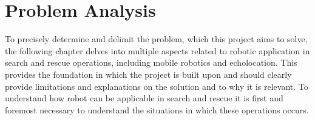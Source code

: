 \chapter{Problem Analysis}\label{Chapter:Problem_analysis}
To precisely determine and delimit the problem, which this project aims to solve, the following chapter delves into multiple aspects related to robotic application in search and rescue operations, including mobile robotics and echolocation. This provides the foundation in which the project is built upon and should clearly provide limitations and explanations on the solution and to why it is relevant. To understand how robot can be applicable in search and rescue it is first and foremost necessary to understand the situations in which these operations occurs.   


